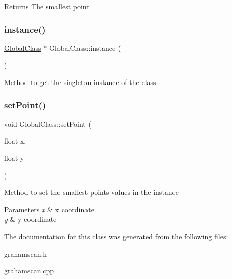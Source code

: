 \begin{DoxyReturn}{Returns}
The smallest point 
\end{DoxyReturn}
\mbox{\label{classGlobalClass_ab368a73e98fc149de7191289c48622a2}} 
\subsubsection{\texorpdfstring{instance()}{instance()}}
{\footnotesize\ttfamily \hyperlink{classGlobalClass}{Global\+Class} $\ast$ Global\+Class\+::instance (\begin{DoxyParamCaption}{ }\end{DoxyParamCaption})\hspace{0.3cm}{\ttfamily [static]}}

Method to get the singleton instance of the class \mbox{\label{classGlobalClass_a896e0a641770d88a910d0f2da17066b8}} 
\subsubsection{\texorpdfstring{set\+Point()}{setPoint()}}
{\footnotesize\ttfamily void Global\+Class\+::set\+Point (\begin{DoxyParamCaption}\item[{float}]{x,  }\item[{float}]{y }\end{DoxyParamCaption})}

Method to set the smallest point\textquotesingle{}s values in the instance 
\begin{DoxyParams}{Parameters}
{\em x} & x coordinate \\
\hline
{\em y} & y coordinate \\
\hline
\end{DoxyParams}


The documentation for this class was generated from the following files\+:\begin{DoxyCompactItemize}
\item 
grahamscan.\+h\item 
grahamscan.\+cpp\end{DoxyCompactItemize}
